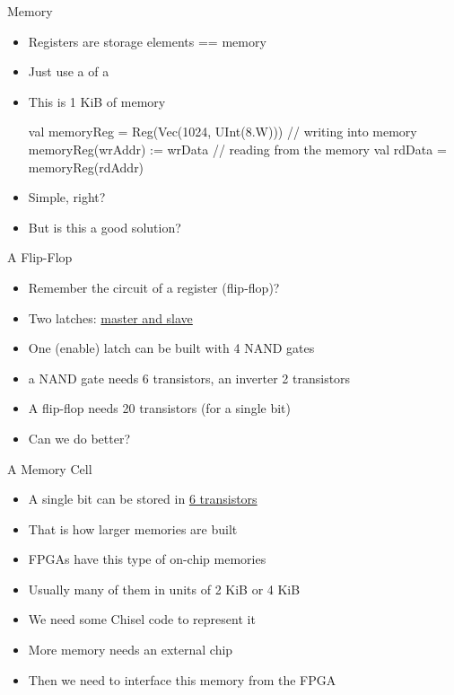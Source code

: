 \begin{frame}[fragile]{Memory}
\begin{itemize}
\item Registers are storage elements == memory
\item Just use a  of a 
\item This is 1 KiB of memory
\begin{chisel}
  val memoryReg = Reg(Vec(1024, UInt(8.W)))
  // writing into memory
  memoryReg(wrAddr) := wrData
  // reading from the memory
  val rdData = memoryReg(rdAddr)
\end{chisel}
\item Simple, right?
\item But is this a good solution?
\end{itemize}
\end{frame}

\begin{frame}[fragile]{A Flip-Flop}
\begin{itemize}
\item Remember the circuit of a register (flip-flop)?
\item Two latches: \href{https://en.wikipedia.org/wiki/Flip-flop_(electronics)#Master%E2%80%93slave_edge-triggered_D_flip-flop}{master and slave}
\item One (enable) latch can be built with 4 NAND gates
\item a NAND gate needs 6 transistors, an inverter 2 transistors
\item A flip-flop needs 20 transistors (for a single bit)
\item Can we do better?
\end{itemize}
\end{frame}

\begin{frame}[fragile]{A Memory Cell}
\begin{itemize}
\item A single bit can be stored in \href{https://en.wikipedia.org/wiki/Static_random-access_memory#/media/File:SRAM_Cell_(6_Transistors).svg}{6 transistors}
\item That is how larger memories are built
\item FPGAs have this type of on-chip memories
\item Usually many of them in units of 2 KiB or 4 KiB
\item We need some Chisel code to represent it
\item More memory needs an external chip
\item Then we need to interface this memory from the FPGA
\end{itemize}
\end{frame}

